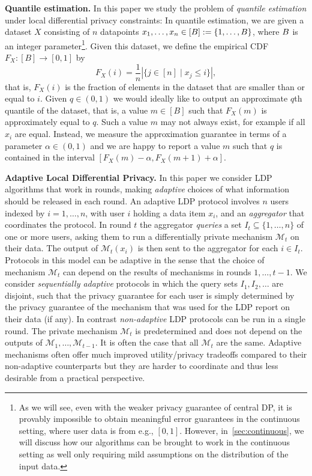 {\bf Quantile estimation.}
In this paper we study the problem of \emph{quantile estimation} under local differential privacy constraints: In quantile estimation, we are given a dataset $X$ consisting of $n$ datapoints $x_1,\dots,x_n \in [B]:=\{1,\dots,B\}$, where $B$ is an integer parameter\footnote{As we will see, even with the weaker privacy guarantee of central DP, it is provably impossible to obtain meaningful error guarantees in the continuous setting, where user data is from e.g., $[0,1]$. However, in~\cref{sec:continuous}, we will discuss how our algorithms can be brought to work in the continuous setting as well only requiring mild assumptions on the distribution of the input data.}. 
%
Given this dataset, we define the empirical CDF $F_X:[B]\to [0,1]$ by 
\begin{equation}
\label{eq: empirical cdf}
F_X(i)=\frac{1}{n}|\{j\in [n]\mid x_j\leq i\}|,
\end{equation}
that is, $F_X(i)$ is the fraction of elements in the dataset that are smaller than or equal to $i$.
Given $q\in (0,1)$ we would ideally like to output an approximate $q$th quantile of the dataset, that is, a value $m\in [B]$ such that $F_X(m)$ is approximately equal to $q$.
%
Such a value $m$ may not always exist, for example if all $x_i$ are equal. Instead, we measure the approximation guarantee in terms of a parameter $\alpha \in (0,1)$ and we are happy to report a value $m$ such that  $q$ is contained in the interval $[F_X(m)-\alpha,F_X(m+1)+\alpha]$.


{\bf Adaptive Local Differential Privacy.}
In this paper we consider LDP algorithms that work in rounds, making \emph{adaptive} choices of what information should be released in each round.
An adaptive LDP protocol involves $n$ users indexed by $i=1,\dots,n$, with user $i$ holding a data item $x_i$, and an \emph{aggregator} that coordinates the protocol.
In round $t$ the aggregator \emph{queries} a set $I_t\subseteq \{1,\dots,n\}$ of one or more users, asking them to run a differentially private mechanism $\mathcal{M}_t$ on their data.
The output of $\mathcal{M}_t(x_i)$ is then sent to the aggregator for each $i\in I_t$.
Protocols in this model can be adaptive in the sense that the choice of mechanism $\mathcal{M}_t$ can depend on the results of mechanisms in rounds $1,\dots,t-1$.
We consider \emph{sequentially adaptive} protocols in which the query sets $I_1, I_2,\dots$ are disjoint, such that the privacy guarantee for each user is simply determined by the privacy guarantee of the mechanism that was used for the LDP report on their data (if any).
%
In contrast \emph{non-adaptive} LDP protocols can be run in a single round. The private mechanism $\mathcal{M}_t$ is predetermined and does not depend on the outputs of $\mathcal{M}_1,\dots, \mathcal{M}_{t-1}$. It is often the case that all $\mathcal{M}_t$ are the same. 
Adaptive mechanisms often offer much improved utility/privacy tradeoffs compared to their non-adaptive counterparts but they are harder to coordinate and thus less desirable from a practical perspective.

